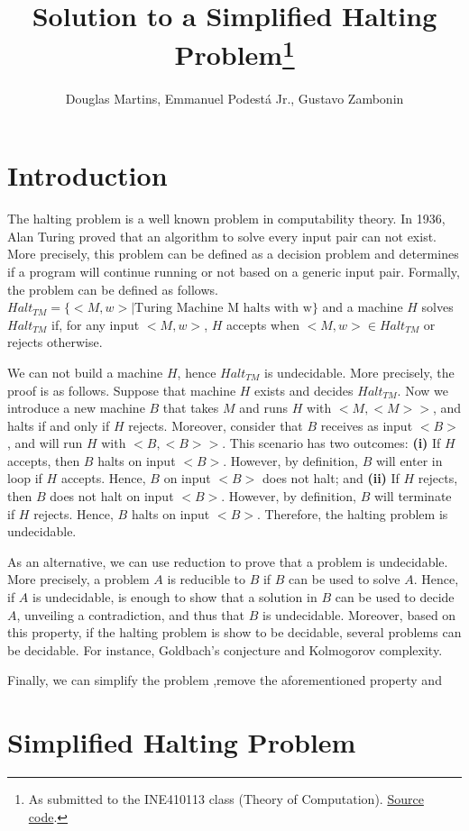\documentclass[12pt]{article}
\title{Solution to a Simplified Halting Problem\footnote{
    As submitted to the INE410113 class (Theory of Computation). \href{https://github.com/zambonin/ine410113}{Source code}.}}
\author{Douglas Martins\inst{1}, Emmanuel Podestá Jr.\inst{1}, Gustavo Zambonin\inst{1}}
\begin{document}
 

\maketitle

\section{Introduction}\label{sec:intro}

The halting problem is a well known problem in computability theory. In 1936, Alan Turing proved that an algorithm to solve every input pair can not exist. More precisely, this problem can be defined as a decision problem and determines if a program will continue running or not based on a generic input pair. Formally, the problem can be defined as follows. $Halt_{TM} = \{<M, w> | \text{Turing Machine M halts with w}\}$ and a machine $H$ solves $Halt_{TM}$ if, for any input $<M,w>$, $H$ accepts when $<M,w> \in Halt_{TM}$ or rejects otherwise. 

We can not build a machine $H$, hence $Halt_{TM}$ is undecidable. More precisely, the proof is as follows. Suppose that machine $H$ exists and decides $Halt_{TM}$. Now we introduce a new machine $B$ that takes $M$ and runs $H$ with $<M, <M>>$, and halts if and only if $H$ rejects. Moreover, consider that $B$ receives as input $<B>$, and will run $H$ with $<B, <B>>$. This scenario has two outcomes: \textbf{(i)} If $H$ accepts, then $B$ halts on input $<B>$. However, by definition, $B$ will enter in loop if $H$ accepts. Hence, $B$ on input $<B>$ does not halt; and \textbf{(ii)} If $H$ rejects, then $B$ does not halt on input $<B>$. However, by definition, $B$ will terminate if $H$ rejects. Hence, $B$ halts on input $<B>$. Therefore, the halting problem is undecidable.

As an alternative, we can use reduction to prove that a problem is undecidable. More precisely, a problem $A$ is reducible to $B$ if $B$ can be used to solve $A$. Hence, if $A$ is undecidable, is enough to show that a solution in $B$ can be used to decide $A$, unveiling a contradiction, and thus that $B$ is undecidable. Moreover, based on this property, if the halting problem is show to be decidable, several problems can be decidable. For instance, Goldbach's conjecture and Kolmogorov complexity.

Finally, we can simplify the problem ,remove the aforementioned property and 

\section{Simplified Halting Problem}\label{sec:halting}
\end{document}
